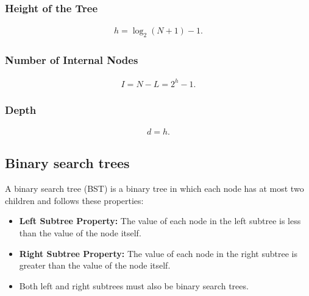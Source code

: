 \documentclass{report}
\begin{document}
\bigbreak \noindent 
\subsubsection{Height of the Tree}
\bigbreak \noindent 
\begin{align*}
    h = \log_2(N+1) - 1
.\end{align*}


\bigbreak \noindent 
\subsubsection{Number of Internal Nodes}
\bigbreak \noindent 
\begin{align*}
    I = N - L = 2^h - 1
.\end{align*}

\bigbreak \noindent 
\subsubsection{Depth}
\bigbreak \noindent 
\begin{align*}
    d = h
.\end{align*}

\pagebreak 
{}
\bigbreak \noindent 
\subsection{Binary search trees}
\bigbreak \noindent 
A binary search tree (BST) is a binary tree in which each node has at most two children and follows these properties:
\begin{itemize}
    \item \textbf{Left Subtree Property:} The value of each node in the left subtree is less than the value of the node itself.
    \item \textbf{Right Subtree Property:} The value of each node in the right subtree is greater than the value of the node itself.
    \item Both left and right subtrees must also be binary search trees.
\end{itemize}
\bigbreak \noindent 
\end{document}
